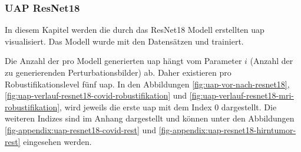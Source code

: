 \subsubsection{UAP ResNet18} \label{chap:UAP ResNet18}
In diesem Kapitel werden die durch das ResNet18 Modell erstellten \acrshort{uap} visualisiert. Das Modell wurde mit den Datensätzen  und  trainiert.

Die Anzahl der pro Modell generierten \acrshort{uap} hängt vom Parameter $i$ (Anzahl der zu generierenden Perturbationsbilder) ab. Daher existieren pro Robustifikationslevel fünf \acrshort{uap}. In den Abbildungen \ref{fig:uap-vor-nach-resnet18}, \ref{fig:uap-verlauf-resnet18-covid-robustifikation} und \ref{fig:uap-verlauf-resnet18-mri-robustifikation}, wird jeweils die erste \acrshort{uap} mit dem Index 0 dargestellt. Die weiteren Indizes sind im Anhang dargestellt und können unter den Abbildungen \ref{fig-appendix:uap-resnet18-covid-rest} und \ref{fig-appendix:uap-resnet18-hirntumor-rest} eingesehen werden.


